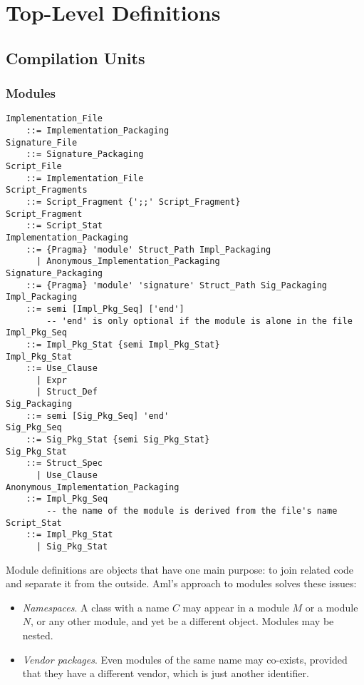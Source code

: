 
\chapter{Top-Level Definitions}

\minitoc

\newpage

\section{Compilation Units}
\label{sec:compilation-units}

\subsection{Modules}
\label{sec:modules}

\grammar\begin{lstlisting}
Implementation_File
    ::= Implementation_Packaging
Signature_File
    ::= Signature_Packaging
Script_File
    ::= Implementation_File
Script_Fragments
    ::= Script_Fragment {';;' Script_Fragment}
Script_Fragment
    ::= Script_Stat
Implementation_Packaging 
    ::= {Pragma} 'module' Struct_Path Impl_Packaging
      | Anonymous_Implementation_Packaging
Signature_Packaging
    ::= {Pragma} 'module' 'signature' Struct_Path Sig_Packaging
Impl_Packaging
    ::= semi [Impl_Pkg_Seq] ['end']  
        -- 'end' is only optional if the module is alone in the file
Impl_Pkg_Seq
    ::= Impl_Pkg_Stat {semi Impl_Pkg_Stat}
Impl_Pkg_Stat 
    ::= Use_Clause
      | Expr
      | Struct_Def
Sig_Packaging
    ::= semi [Sig_Pkg_Seq] 'end'
Sig_Pkg_Seq 
    ::= Sig_Pkg_Stat {semi Sig_Pkg_Stat}
Sig_Pkg_Stat
    ::= Struct_Spec
      | Use_Clause
Anonymous_Implementation_Packaging
    ::= Impl_Pkg_Seq
        -- the name of the module is derived from the file's name
Script_Stat
    ::= Impl_Pkg_Stat
      | Sig_Pkg_Stat
\end{lstlisting}

Module definitions are objects that have one main purpose: to join related code and separate it from the outside. Aml's approach to modules solves these issues: 
\begin{itemize}
  \item {\em Namespaces}. A class with a name $C$ may appear in a module $M$ or a module $N$, or any other module, and yet be a different object. Modules may be nested.
  \item {\em Vendor packages}. Even modules of the same name may co-exists, provided that they have a different vendor, which is just another identifier. 
\end{itemize}

